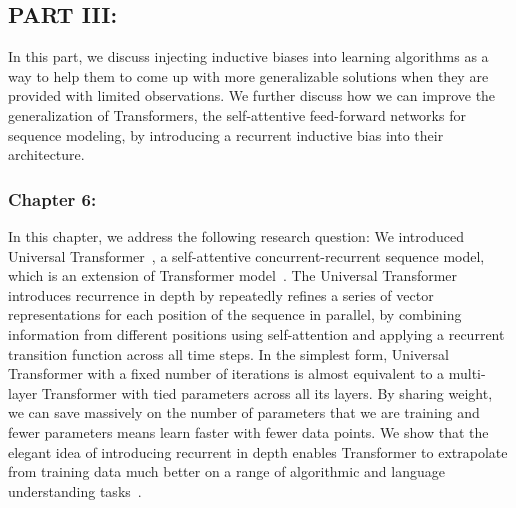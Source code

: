 \subsection*{PART III: }
In this part, we discuss injecting inductive biases into learning algorithms as a way to help them to come up with more generalizable solutions when they are provided with limited observations. We further discuss how we can improve the generalization of Transformers, the self-attentive feed-forward networks for sequence modeling, by introducing a recurrent inductive bias into their architecture.

\subsubsection*{Chapter 6: }
In this chapter, we address the following research question:
We introduced Universal Transformer~\citep{Dehghani:ICLR:2019}, a self-attentive concurrent-recurrent sequence model, which is an extension of Transformer model~\citep{vaswani2017attention}. The Universal Transformer introduces recurrence in depth by repeatedly refines a series of vector representations for each position of the sequence in parallel, by combining information from different positions using self-attention and applying a recurrent transition function across all time steps. 
In the simplest form, Universal Transformer with a fixed number of iterations is almost equivalent to a multi-layer Transformer with tied parameters across all its layers. By sharing weight, we can save massively on the number of parameters that we are training and fewer parameters means learn faster with fewer data points.  We show that the elegant idea of introducing recurrent in depth enables Transformer to extrapolate from training data much better on a range of algorithmic and language understanding tasks~\citep{Dehghani:ICLR:2019, Dehghani:2019:WSDM}.



